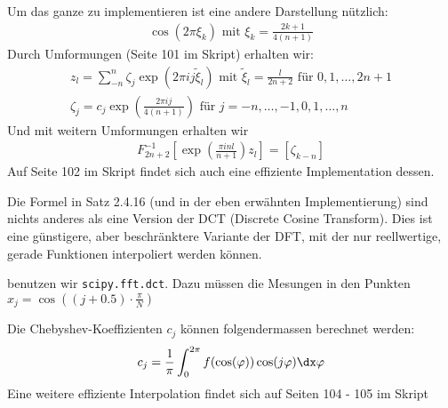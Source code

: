 Um das ganze zu implementieren ist eine andere Darstellung nützlich:
\begin{align*}
    \cos(2\pi \xi_k) \text{ mit } \xi_k = \frac{2k + 1}{4(n + 1)}
\end{align*}
Durch Umformungen (Seite 101 im Skript) erhalten wir:
\begin{align*}
    z_l = \sum_{-n}^{n} \zeta_j \exp\left( 2\pi ij \tilde{\xi}_l \right) \text{ mit } \tilde{\xi}_l = \frac{l}{2n + 2} \text{ für } 0, 1, \ldots, 2n + 1\\
    \zeta_j = c_j \exp\left( \frac{2 \pi ij}{4(n + 1)} \right) \text{ für } j = -n, \ldots, -1, 0, 1, \ldots, n
\end{align*}
Und mit weitern Umformungen erhalten wir
\begin{align*}
    F^{-1}_{2n + 2} \left[ \exp\left( \frac{\pi inl}{n + 1} \right) z_l \right] = [\zeta_{k -n}]
\end{align*}
Auf Seite 102 im Skript findet sich auch eine effiziente Implementation dessen.

\inlineremark Die Formel in Satz 2.4.16 (und in der eben erwähnten Implementierung) sind nichts anderes als eine Version der DCT (Discrete Cosine Transform).
Dies ist eine günstigere, aber beschränktere Variante der DFT, mit der nur reellwertige, gerade Funktionen interpoliert werden können.

\innumpy benutzen wir \texttt{scipy.fft.dct}. Dazu müssen die Mesungen in den Punkten $x_j = \cos\left( (j + 0.5) \cdot \frac{\pi}{N} \right)$

\inlineremark Die Chebyshev-Koeffizienten $c_j$ können folgendermassen berechnet werden:
\rmvspace
\begin{align*}
    c_j = \frac{1}{\pi} \int_{0}^{2\pi} f(\cos(\varphi)) \cos(j \varphi) \dx \varphi
\end{align*}
Eine weitere effiziente Interpolation findet sich auf Seiten 104 - 105 im Skript
